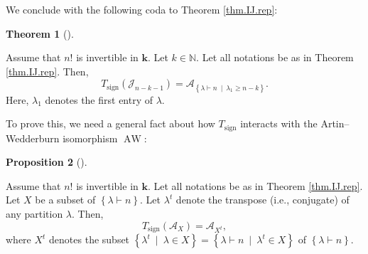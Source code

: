 \documentclass[numbers=enddot,12pt,final,onecolumn,notitlepage]{scrartcl}%
\numberwithin{exer}{subsection}
\theoremstyle{definition}
\newtheorem{theo}{Theorem}[subsection]
\newenvironment{theorem}[1][]
{\begin{theo}[#1]\begin{leftbar}}
{\end{leftbar}\end{theo}}
\newtheorem{prop}[theo]{Proposition}
\newenvironment{proposition}[1][]
{\begin{prop}[#1]\begin{leftbar}}
{\end{leftbar}\end{prop}}
\begin{document}
We conclude with the following coda to Theorem \ref{thm.IJ.rep}:

\begin{theorem}
\label{thm.TJ.rep}Assume that $n!$ is invertible in $\mathbf{k}$. Let
$k\in\mathbb{N}$. Let all notations be as in Theorem \ref{thm.IJ.rep}. Then,%
\[
T_{\operatorname*{sign}}\left(  \mathcal{J}_{n-k-1}\right)  =\mathcal{A}%
_{\left\{  \lambda\vdash n\ \mid\ \lambda_{1}\geq n-k\right\}  }.
\]
Here, $\lambda_{1}$ denotes the first entry of $\lambda$.
\end{theorem}

To prove this, we need a general fact about how $T_{\operatorname*{sign}}$
interacts with the Artin--Wedderburn isomorphism $\operatorname*{AW}$:

\begin{proposition}
\label{prop.AW.dual-A}Assume that $n!$ is invertible in $\mathbf{k}$. Let all
notations be as in Theorem \ref{thm.IJ.rep}. Let $X$ be a subset of $\left\{
\lambda\vdash n\right\}  $. Let $\lambda^{t}$ denote the transpose (i.e.,
conjugate) of any partition $\lambda$. Then,%
\[
T_{\operatorname*{sign}}\left(  \mathcal{A}_{X}\right)  =\mathcal{A}_{X^{t}},
\]
where $X^{t}$ denotes the subset $\left\{  \lambda^{t}\ \mid\ \lambda\in
X\right\}  =\left\{  \lambda\vdash n\ \mid\ \lambda^{t}\in X\right\}  $ of
$\left\{  \lambda\vdash n\right\}  $.
\end{proposition}
\end{document}
